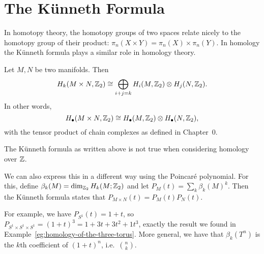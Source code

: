 \section{The Künneth Formula}
In homotopy theory, the homotopy groups of two spaces relate nicely to the homotopy group of their product: $\pi_n(X \times Y) = \pi_n(X) \times \pi_n(Y)$.
In homology the Künneth formula plays a similar role in homology theory.
\begin{prop}
    Let $M, N$ be two manifolds. Then
    \[
        H_k(M \times N, \mathbb{Z}_2) \cong
        \bigoplus_{i+j  = k} H_i(M, \mathbb{Z}_2) \otimes H_j(N, \mathbb{Z}_2)
    .\]
In other words,
\[
    H_{\bullet}(M \times N, \mathbb{Z}_2) \cong H_{\bullet}(M, \mathbb{Z}_2) \otimes H_\bullet(N, \mathbb{Z}_2)
,\] 
with the tensor product of chain complexes as defined in Chapter~0.
\end{prop}
\begin{remark}
    The Künneth formula as written above is not true when considering homology over $\mathbb{Z}$.
\end{remark}
\begin{remark}
    We can also express this in a different way using the Poincaré polynomial.
    For this, define $\beta_k(M) = \dim_{\mathbb{Z}_2} H_k(M;\mathbb{Z}_2)$ and let $P_M(t) = \sum_k \beta_k(M) ^{k}$.
    Then the Künneth formula states that $P_{M \times N}(t) = P_M(t) P_N(t)$.


    For example, we have $P_{S^{1}}(t) = 1 + t$, so $P_{S^{1}\times S^{1}\times S^{1}} = (1 + t)^3 = 1 + 3t + 3t^2 + 1t^3$, exactly the result we found in Example~\ref{eg:homology-of-the-three-torus}.
    More general, we have that $\beta_k(T^{n})$ is the $k$th coefficient of $(1+t)^{n}$, i.e.\ $\binom{n}{k}$.
\end{remark}
